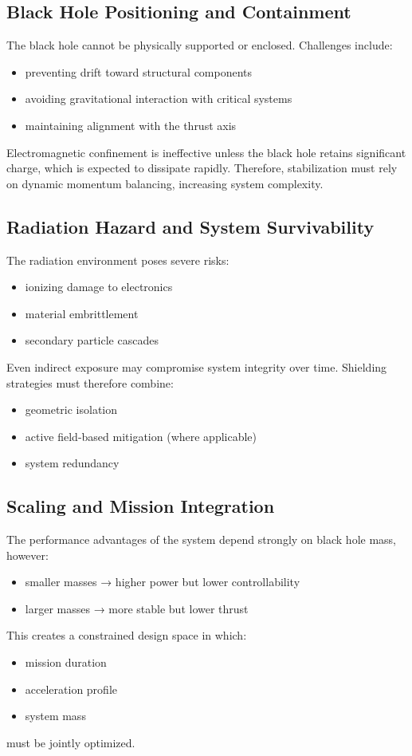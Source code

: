 \documentclass[conference]{IEEEtran}
\begin{document}
\subsection{Black Hole Positioning and Containment}
The black hole cannot be physically supported or enclosed. Challenges include:
\begin{itemize}
\item preventing drift toward structural components
\item avoiding gravitational interaction with critical systems
\item maintaining alignment with the thrust axis
\end{itemize}
Electromagnetic confinement is ineffective unless the black hole retains significant charge, which is expected to dissipate rapidly. Therefore, stabilization must rely on dynamic momentum balancing, increasing system complexity.
\subsection{Radiation Hazard and System Survivability}
The radiation environment poses severe risks:
\begin{itemize}
\item ionizing damage to electronics
\item material embrittlement
\item secondary particle cascades
\end{itemize}
Even indirect exposure may compromise system integrity over time. Shielding strategies must therefore combine:
\begin{itemize}
\item geometric isolation
\item active field-based mitigation (where applicable)
\item system redundancy
\end{itemize}
\subsection{Scaling and Mission Integration}
The performance advantages of the system depend strongly on black hole mass, however:
\begin{itemize}
\item smaller masses → higher power but lower controllability
\item larger masses → more stable but lower thrust
\end{itemize}
This creates a constrained design space in which:
\begin{itemize}
\item mission duration
\item acceleration profile
\item system mass
\end{itemize}
must be jointly optimized.
\end{document}
